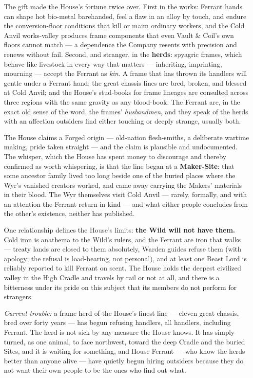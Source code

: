 The gift made the House's fortune twice over. First in the works: Ferrant hands can shape hot bio-metal barehanded, feel a flaw in an alloy by touch, and endure the conversion-floor conditions that kill or maim ordinary workers, and the Cold Anvil works-valley produces frame components that even Vault \& Coil's own floors cannot match --- a dependence the Company resents with precision and renews without fail. Second, and stranger, in the \textbf{herds}: spyagric frames, which behave like livestock in every way that matters --- inheriting, imprinting, mourning --- accept the Ferrant as \textit{kin}. A frame that has thrown its handlers will gentle under a Ferrant hand; the great chassis lines are bred, broken, and blessed at Cold Anvil; and the House's stud-books for frame lineages are consulted across three regions with the same gravity as any blood-book. The Ferrant are, in the exact old sense of the word, the frames' \textit{husbandmen}, and they speak of the herds with an affection outsiders find either touching or deeply strange, usually both.

The House claims a Forged origin --- old-nation flesh-smiths, a deliberate wartime making, pride taken straight --- and the claim is plausible and undocumented. The whisper, which the House has spent money to discourage and thereby confirmed as worth whispering, is that the line began at a \textbf{Maker-Site}: that some ancestor family lived too long beside one of the buried places where the Wyr's vanished creators worked, and came away carrying the Makers' materials in their blood. The Wyr themselves visit Cold Anvil --- rarely, formally, and with an attention the Ferrant return in kind --- and what either people concludes from the other's existence, neither has published.

One relationship defines the House's limits: \textbf{the Wild will not have them.} Cold iron is anathema to the Wild's rulers, and the Ferrant are iron that walks --- treaty lands are closed to them absolutely, Warden guides refuse them (with apology; the refusal is load-bearing, not personal), and at least one Beast Lord is reliably reported to kill Ferrant on scent. The House holds the deepest civilized valley in the High Cradle and travels by rail or not at all, and there is a bitterness under its pride on this subject that its members do not perform for strangers.

\textit{Current trouble:} a frame herd of the House's finest line --- eleven great chassis, bred over forty years --- has begun refusing handlers, all handlers, including Ferrant. The herd is not sick by any measure the House knows. It has simply turned, as one animal, to face northwest, toward the deep Cradle and the buried Sites, and it is waiting for something, and House Ferrant --- who know the herds better than anyone alive --- have quietly begun hiring outsiders because they do not want their own people to be the ones who find out what.

